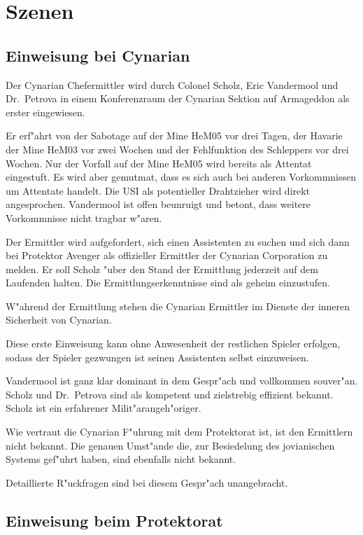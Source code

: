 \section{Szenen}

\subsection{Einweisung bei Cynarian}

Der Cynarian Chefermittler wird durch Colonel Scholz, Eric Vandermool und Dr.~Petrova in einem Konferenzraum der Cynarian Sektion auf Armageddon als erster eingewiesen.

Er erf"ahrt von der Sabotage auf der Mine HeM05 vor drei Tagen, der Havarie der Mine HeM03 vor zwei Wochen und der Fehlfunktion des Schleppers vor drei Wochen. Nur der Vorfall auf der Mine HeM05 wird bereits als Attentat eingestuft. Es wird aber gemutma\3t, dass es sich auch bei anderen Vorkommnissen um Attentate handelt. Die USI als potentieller Drahtzieher wird direkt angesprochen. Vandermool ist offen beunruigt und betont, dass weitere Vorkommnisse nicht tragbar w"aren.

Der Ermittler wird aufgefordert, sich einen Assistenten zu suchen und sich dann bei Protektor Avenger als offizieller Ermittler der Cynarian Corporation zu melden. Er soll Scholz "uber den Stand der Ermittlung jederzeit auf dem Laufenden halten. Die Ermittlungserkenntnisse sind als geheim einzustufen.

W"ahrend der Ermittlung stehen die Cynarian Ermittler im Dienste der inneren Sicherheit von Cynarian.

\begin{remarks}
Diese erste Einweisung kann ohne Anwesenheit der restlichen Spieler erfolgen, sodass der Spieler gezwungen ist seinen Assistenten selbst einzuweisen.

Vandermool ist ganz klar dominant in dem Gespr"ach und vollkommen souver"an. Scholz und Dr.~Petrova sind als kompetent und zielstrebig effizient bekannt. Scholz ist ein erfahrener Milit"arangeh"origer.

Wie vertraut die Cynarian F"uhrung mit dem Protektorat ist, ist den Ermittlern nicht bekannt. Die genauen Umst"ande die, zur Besiedelung des jovianischen Systems gef"uhrt haben, sind ebenfalls nicht bekannt.

Detaillierte R"uckfragen sind bei diesem Gespr"ach unangebracht.
\end{remarks}

\subsection{Einweisung beim Protektorat}

